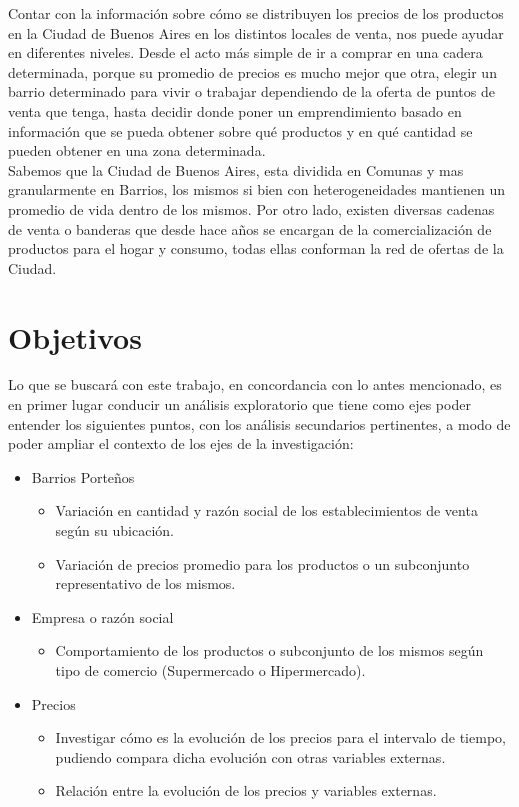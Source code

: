 Contar con la información sobre cómo se distribuyen los precios de los productos en la Ciudad de Buenos Aires en los distintos locales de venta, nos puede ayudar en diferentes niveles. Desde el acto más simple de ir a comprar en una cadera determinada, porque su promedio de precios es mucho mejor que otra, elegir un barrio determinado para vivir o trabajar dependiendo de la oferta de puntos de venta que tenga, hasta decidir donde poner un emprendimiento basado en información que se pueda obtener sobre qué productos y en qué cantidad se pueden obtener en una zona determinada.\\
Sabemos que la Ciudad de Buenos Aires, esta dividida en Comunas y mas granularmente en Barrios, los mismos si bien con heterogeneidades mantienen un promedio de vida dentro de los mismos. Por otro lado, existen diversas cadenas de venta o banderas que desde hace años se encargan de la comercialización de productos para el hogar y consumo, todas ellas conforman la red de ofertas de la Ciudad. \\


\section{Objetivos}
Lo que se buscará con este trabajo, en concordancia con lo antes mencionado, es en primer lugar conducir un análisis exploratorio que tiene como ejes poder entender los siguientes puntos, con los análisis secundarios pertinentes, a modo de poder ampliar el contexto de los ejes de la investigación:

\begin{itemize}
	\item Barrios Porteños
    \begin{itemize}
    	\item Variación en cantidad y razón social de los establecimientos de venta según su ubicación.
        \item Variación de precios promedio para los productos o un subconjunto representativo de los mismos.
    \end{itemize}
    \item Empresa o razón social
    \begin{itemize}
    	\item Comportamiento de los productos o subconjunto de los mismos según tipo de comercio (Supermercado o Hipermercado). 
    \end{itemize}
    \item Precios
    \begin{itemize}
    	\item  Investigar cómo es la evolución de los precios para el intervalo de tiempo, pudiendo compara dicha evolución con otras variables externas.
    	\item Relación entre la evolución de los precios y variables externas.
    \end{itemize}
\end{itemize}


